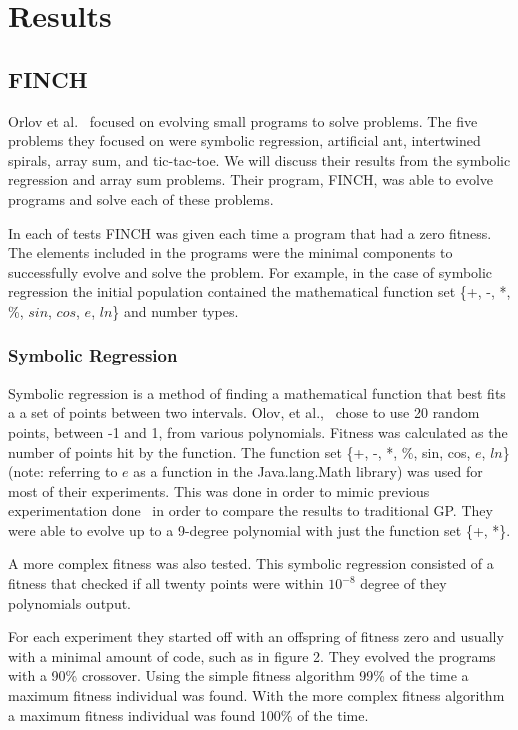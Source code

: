 \documentclass{sig-alternate}
\begin{document}
\section{Results}
\subsection{FINCH}
Orlov et al.~\cite{FINCH:2011} focused on evolving small programs to solve problems. The five problems they focused on were symbolic regression, artificial ant, intertwined spirals, array sum, and tic-tac-toe. We will discuss their results from the symbolic regression and array sum problems. Their program, FINCH, was able to evolve programs and solve each of these problems.

In each of tests FINCH was given each time a program that had a zero fitness. The elements included in the programs were the minimal components to successfully evolve and solve the problem. For example, in the case of symbolic regression the initial population contained the mathematical function set \{+, -, *, \%, $sin$, $cos$, $e$,  $ln$\} and number types.


\subsubsection{Symbolic Regression}
Symbolic regression is a method of finding a mathematical function that best fits a a set of points between two intervals. Olov, et al.,~\cite{FINCH:2011} chose to use 20 random points, between -1 and 1, from various polynomials. Fitness was calculated as the number of points hit by the function. The function set \{+, -, *, \%, sin, cos, $e$, $ln$\}(note: referring to $e$ as a function in the Java.lang.Math library) was used for most of their experiments. This was done in order to mimic previous experimentation done~\cite{koza:1992} in order to compare the results to traditional GP. They were able to evolve up to a 9-degree polynomial with just the function set \{+, *\}.

A more complex fitness was also tested. This symbolic regression consisted of a fitness that checked if all twenty points were within $10^{-8}$ degree of they polynomials output. 

For each experiment they started off with an offspring of fitness zero and usually with a minimal amount of code, such as in figure 2. They evolved the programs with a 90\% crossover. Using the simple fitness algorithm 99\% of the time a maximum fitness individual was found. With the more complex fitness algorithm a maximum fitness individual was found 100\% of the time.
\end{document}

